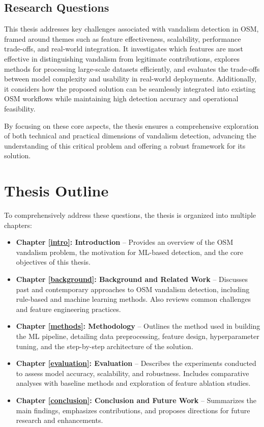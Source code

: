 \documentclass[
    13pt, %
    a4paper, %
    DIV14, %
    listof=totoc, %
    bibliography=totoc, %
    index=totoc, %
    headsepline
]{scrreprt}
\begin{document}
\subsection*{Research Questions}

This thesis addresses key challenges associated with vandalism detection in OSM, framed around themes such as feature effectiveness, scalability, performance trade-offs, and real-world integration. It investigates which features are most effective in distinguishing vandalism from legitimate contributions, explores methods for processing large-scale datasets efficiently, and evaluates the trade-offs between model complexity and usability in real-world deployments. Additionally, it considers how the proposed solution can be seamlessly integrated into existing OSM workflows while maintaining high detection accuracy and operational feasibility.

\vspace*{1cm}
\noindent By focusing on these core aspects, the thesis ensures a comprehensive exploration of both technical and practical dimensions of vandalism detection, advancing the understanding of this critical problem and offering a robust framework for its solution.


\section{Thesis Outline}

To comprehensively address these questions, the thesis is organized into multiple chapters:

\begin{itemize}
  \item \textbf{Chapter \ref{intro}: Introduction} – Provides an overview of the OSM vandalism problem, the motivation for ML-based detection, and the core objectives of this thesis.
  \item \textbf{Chapter \ref{background}: Background and Related Work} – Discusses past and contemporary approaches to OSM vandalism detection, including rule-based and machine learning methods. Also reviews common challenges and feature engineering practices.
  \item \textbf{Chapter \ref{methods}: Methodology} – Outlines the method used in building the ML pipeline, detailing data preprocessing, feature design, hyperparameter tuning, and the step-by-step architecture of the solution.
  \item \textbf{Chapter \ref{evaluation}: Evaluation} – Describes the experiments conducted to assess model accuracy, scalability, and robustness. Includes comparative analyses with baseline methods and exploration of feature ablation studies.
  \item \textbf{Chapter \ref{conclusion}: Conclusion and Future Work} – Summarizes the main findings, emphasizes contributions, and proposes directions for future research and enhancements.
\end{itemize}
\end{document}
